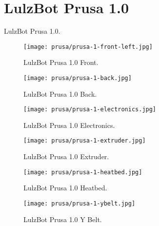 %
%
%
%
%

\section{LulzBot Prusa 1.0}
LulzBot Prusa 1.0.

\begin{figure}[h!]
\texttt{[image: prusa/prusa-1-front-left.jpg]}
 \caption{LulzBot Prusa 1.0 Front.}
 \label{fig:prusa-1-front-left}
\end{figure}

\begin{figure}[h!]
\texttt{[image: prusa/prusa-1-back.jpg]}
 \caption{LulzBot Prusa 1.0 Back.}
 \label{fig:prusa-1-back}
\end{figure}

\begin{figure}[h!]
\texttt{[image: prusa/prusa-1-electronics.jpg]}
 \caption{LulzBot Prusa 1.0 Electronics.}
 \label{fig:prusa-1-electronics}
\end{figure}

\begin{figure}[h!]
\texttt{[image: prusa/prusa-1-extruder.jpg]}
 \caption{LulzBot Prusa 1.0 Extruder.}
 \label{fig:prusa-1-extruder}
\end{figure}

\begin{figure}[h!]
\texttt{[image: prusa/prusa-1-heatbed.jpg]}
 \caption{LulzBot Prusa 1.0 Heatbed.}
 \label{fig:prusa-1-heatbed}
\end{figure}

\begin{figure}[h!]
\texttt{[image: prusa/prusa-1-ybelt.jpg]}
 \caption{LulzBot Prusa 1.0 Y Belt.}
 \label{fig:prusa-1-ybelt}
\end{figure}


